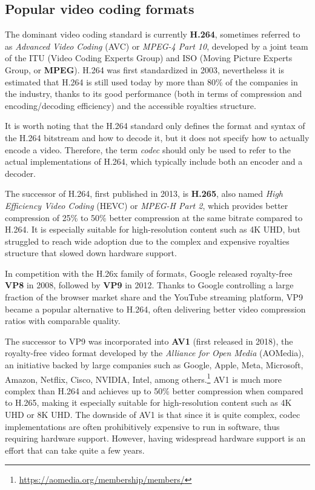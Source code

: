 \subsection{Popular video coding formats}
\label{sec:bg/compression/codecs}

The dominant video coding standard is currently \textbf{H.264}, sometimes referred to as \textit{Advanced Video Coding} (AVC) or \textit{MPEG-4 Part 10}, developed by a joint team of the ITU (Video Coding Experts Group) and ISO (Moving Picture Experts Group, or \textbf{MPEG}). H.264 was first standardized in 2003, nevertheless it is estimated that H.264 is still used today by more than 80\% of the companies in the industry, thanks to its good performance (both in terms of compression and encoding/decoding efficiency) and the accessible royalties structure.\cite{bitmovin}

It is worth noting that the H.264 standard only defines the format and syntax of the H.264 bitstream and how to decode it, but it does not specify how to actually encode a video. Therefore, the term \textit{codec} should only be used to refer to the actual implementations of H.264, which typically include both an encoder and a decoder.

The successor of H.264, first published in 2013, is \textbf{H.265}, also named \textit{High Efficiency Video Coding} (HEVC) or \textit{MPEG-H Part 2}, which provides better compression of 25\% to 50\% better compression at the same bitrate compared to H.264. It is especially suitable for high-resolution content such as 4K UHD, but struggled to reach wide adoption due to the complex and expensive royalties structure that slowed down hardware support.\cite{hevcroyalties}

In competition with the H.26x family of formats, Google released royalty-free \textbf{VP8} in 2008, followed by \textbf{VP9} in 2012. Thanks to Google controlling a large fraction of the browser market share and the YouTube streaming platform, VP9 became a popular alternative to H.264, often delivering better video compression ratios with comparable quality.


The successor to VP9 was incorporated into \textbf{AV1} (first released in 2018), the royalty-free video format developed by the \textit{Alliance for Open Media} (AOMedia), an initiative backed by large companies such as Google, Apple, Meta, Microsoft, Amazon, Netflix, Cisco, NVIDIA, Intel, among others.\footnote{\url{https://aomedia.org/membership/members/}} AV1 is much more complex than H.264 and achieves up to 50\% better compression when compared to H.265, making it especially suitable for high-resolution content such as 4K UHD or 8K UHD. The downside of AV1 is that since it is quite complex, codec implementations are often prohibitively expensive to run in software, thus requiring hardware support. However, having widespread hardware support is an effort that can take quite a few years.\cite{av1}

